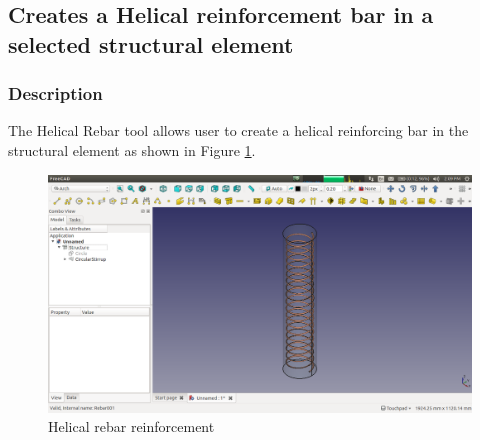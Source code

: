 \subsection{Creates a Helical reinforcement bar in a selected structural element}

\subsubsection{Description}
The Helical Rebar tool allows user to create a helical reinforcing bar in the structural element as shown in Figure \ref{helicalshaperebar}.
\begin{figure}
    \centering \includegraphics[scale=0.35]{images/HelicalRebar.png}
    \caption{Helical rebar reinforcement}
    \label{helicalshaperebar}
\end{figure}
